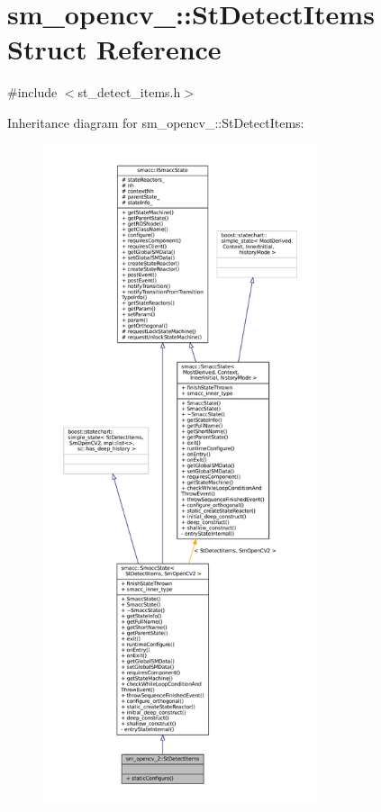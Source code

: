 \hypertarget{structsm__opencv__2_1_1StDetectItems}{}\section{sm\+\_\+opencv\+\_\+:\+:St\+Detect\+Items Struct Reference}
\label{structsm__opencv__2_1_1StDetectItems}


{\ttfamily \#include $<$st\+\_\+detect\+\_\+items.\+h$>$}



Inheritance diagram for sm\+\_\+opencv\+\_\+:\+:St\+Detect\+Items\+:
\nopagebreak
\begin{figure}[H]
\begin{center}
\leavevmode
\includegraphics[height=550pt]{structsm__opencv__2_1_1StDetectItems__inherit__graph}
\end{center}
\end{figure}


